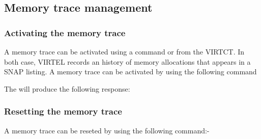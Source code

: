 \documentclass[letterpaper,10pt,english]{sphinxmanual}
\begin{document}
\ignorespaces 

\subsection{Memory trace management}
\label{\detokenize{audit_operations_ and_performance:memory-trace-management}}\label{\detokenize{audit_operations_ and_performance:index-42}}

\subsubsection{Activating the memory trace}
\label{\detokenize{audit_operations_ and_performance:activating-the-memory-trace}}
A memory trace can be activated using a command or from the VIRTCT. In both case, VIRTEL records an history of memory allocations that appears in a SNAP listing. A memory trace can be activated by using the following command

\begin{sphinxVerbatim}[commandchars=\\\{\}]
\end{sphinxVerbatim}

The will produce the following response:

\begin{sphinxVerbatim}[commandchars=\\\{\}]
 
   
          
\end{sphinxVerbatim}


\subsubsection{Resetting the memory trace}
\label{\detokenize{audit_operations_ and_performance:resetting-the-memory-trace}}
A memory trace can be reseted by using the following command:-

\begin{sphinxVerbatim}[commandchars=\\\{\}]
\end{sphinxVerbatim}
\end{document}
